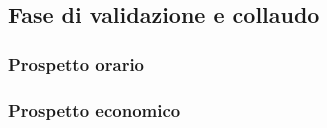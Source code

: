 \subsection{Fase di validazione e collaudo}
	\subsubsection{Prospetto orario}
	\subsubsection{Prospetto economico}